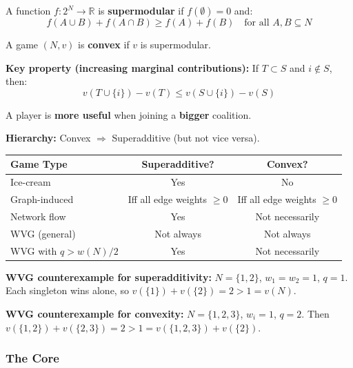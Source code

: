 \begin{defbox}
A function $f: 2^N \to \mathbb{R}$ is \textbf{supermodular} if $f(\emptyset) = 0$ and:
\[
f(A \cup B) + f(A \cap B) \geq f(A) + f(B) \quad \text{for all } A, B \subseteq N
\]

A game $(N, v)$ is \textbf{convex} if $v$ is supermodular.

\textbf{Key property (increasing marginal contributions):}
If $T \subset S$ and $i \notin S$, then:
\[
v(T \cup \{i\}) - v(T) \leq v(S \cup \{i\}) - v(S)
\]

A player is \textbf{more useful} when joining a \textbf{bigger} coalition.

\textbf{Hierarchy:} Convex $\Rightarrow$ Superadditive (but not vice versa).
\end{defbox}

\begin{exbox}
\begin{center}
\renewcommand{\arraystretch}{1.3}
\begin{tabular}{@{} l c c @{}}
\toprule
\textbf{Game Type} & \textbf{Superadditive?} & \textbf{Convex?} \\
\midrule
Ice-cream & Yes & No \\
Graph-induced & Iff all edge weights $\geq 0$ & Iff all edge weights $\geq 0$ \\
Network flow & Yes & Not necessarily \\
WVG (general) & Not always & Not always \\
WVG with $q > w(N)/2$ & Yes & Not necessarily \\
\bottomrule
\end{tabular}
\end{center}

\textbf{WVG counterexample for superadditivity:} $N = \{1,2\}$, $w_1 = w_2 = 1$, $q = 1$. Each singleton wins alone, so $v(\{1\}) + v(\{2\}) = 2 > 1 = v(N)$.

\textbf{WVG counterexample for convexity:} $N = \{1,2,3\}$, $w_i = 1$, $q = 2$. Then $v(\{1,2\}) + v(\{2,3\}) = 2 > 1 = v(\{1,2,3\}) + v(\{2\})$.
\end{exbox}

\bigseparator

\subsubsection{The Core}

